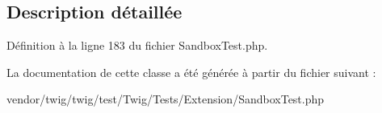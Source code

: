 \subsection{Description détaillée}


Définition à la ligne 183 du fichier Sandbox\+Test.\+php.



La documentation de cette classe a été générée à partir du fichier suivant \+:\begin{DoxyCompactItemize}
\item 
vendor/twig/twig/test/\+Twig/\+Tests/\+Extension/Sandbox\+Test.\+php\end{DoxyCompactItemize}
